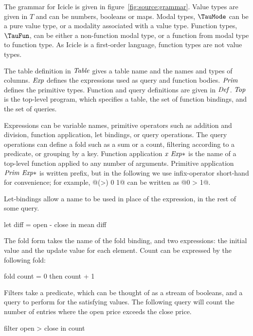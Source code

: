 



The grammar for Icicle is given in figure~\ref{fig:source:grammar}.
Value types are given in $T$ and can be numbers, booleans or maps.
Modal types, $\TauMode$ can be a pure value type, or a modality associated with a value type.
Function types, $\TauFun$, can be either a non-function modal type, or a function from modal type to function type.
As Icicle is a first-order language, function types are not value types.

The table definition in $\mathit{Table}$ gives a table name and the names and types of columns.
$\mathit{Exp}$ defines the expressions used as query and function bodies.
$\mathit{Prim}$ defines the primitive types.
Function and query definitions are given in $\mathit{Def}$.
$\mathit{Top}$ is the top-level program, which specifies a table, the set of function bindings, and the set of queries.

Expressions can be variable names, primitive operators such as addition and division, function application, let bindings, or query operations.
The query operations can define a fold such as a sum or a count, filtering according to a predicate, or grouping by a key.
Function application $\mathit{x~Exp*}$ is the name of a top-level function applied to any number of arguments.
Primitive application $\mathit{Prim~Exp*}$ is written prefix, but in the following we use infix-operator short-hand for convenience; for example, @(>) 0 1@ can be written as @0 > 1@.

Let-bindings allow a name to be used in place of the expression, in the rest of some query.
\begin{code}
let diff = open - close
in  mean diff
\end{code}

The fold form takes the name of the fold binding, and two expressions: the initial value and the update value for each element.
Count can be expressed by the following fold:
\begin{code}
fold count = 0 then count + 1
\end{code}

Filters take a predicate, which can be thought of as a stream of booleans, and a query to perform for the satisfying values.
The following query will count the number of entries where the open price exceeds the close price.
\begin{code}
filter open > close in count
\end{code}

